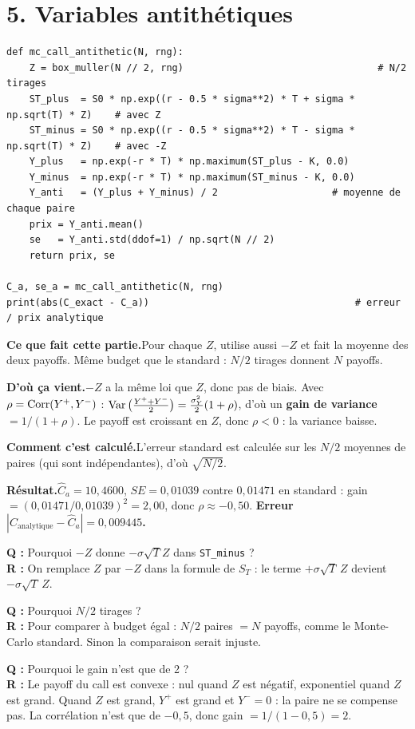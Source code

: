 \documentclass[11pt,a4paper]{article}
\newcommand{\quoi}[1]{\par\noindent\textbf{\color{bleu}Ce que fait cette partie.}\enspace #1\par}
\newcommand{\source}[1]{\par\noindent\textbf{\color{orange}D'où ça vient.}\enspace #1\par}
\newcommand{\calcul}[1]{\par\noindent\textbf{\color{bleu}Comment c'est calculé.}\enspace #1\par}
\newcommand{\resultat}[1]{\par\noindent\textbf{\color{vert}Résultat.}\enspace #1\par}
\newcommand{\prof}[2]{\begin{tcolorbox}[colback=orange!6,colframe=orange!80,boxrule=0.4pt,arc=2pt,left=5pt,right=5pt,top=2pt,bottom=2pt]\small\textbf{Q :} #1\\[1pt]\textbf{R :} #2\end{tcolorbox}}
\newcommand{\sect}[1]{\clearpage\section{#1}}
\begin{document}
\sect{5. Variables antithétiques}
\begin{lstlisting}
def mc_call_antithetic(N, rng):
    Z = box_muller(N // 2, rng)                                  # N/2 tirages
    ST_plus  = S0 * np.exp((r - 0.5 * sigma**2) * T + sigma * np.sqrt(T) * Z)    # avec Z
    ST_minus = S0 * np.exp((r - 0.5 * sigma**2) * T - sigma * np.sqrt(T) * Z)    # avec -Z
    Y_plus   = np.exp(-r * T) * np.maximum(ST_plus - K, 0.0)
    Y_minus  = np.exp(-r * T) * np.maximum(ST_minus - K, 0.0)
    Y_anti   = (Y_plus + Y_minus) / 2                    # moyenne de chaque paire
    prix = Y_anti.mean()
    se   = Y_anti.std(ddof=1) / np.sqrt(N // 2)
    return prix, se

C_a, se_a = mc_call_antithetic(N, rng)
print(abs(C_exact - C_a))                                    # erreur / prix analytique
\end{lstlisting}
\quoi{Pour chaque $Z$, utilise aussi $-Z$ et fait la moyenne des deux payoffs. Même budget que le standard : $N/2$ tirages donnent $N$ payoffs.}
\source{$-Z$ a la même loi que $Z$, donc pas de biais. Avec $\rho = \operatorname{Corr}(Y^+,Y^-)$ : $\operatorname{Var}\big(\frac{Y^++Y^-}{2}\big) = \frac{\sigma_Y^2}{2}(1+\rho)$, d'où un \textbf{gain de variance} $= 1/(1+\rho)$. Le payoff est croissant en $Z$, donc $\rho<0$ : la variance baisse.}
\calcul{L'erreur standard est calculée sur les $N/2$ moyennes de paires (qui sont indépendantes), d'où $\sqrt{N/2}$.}
\resultat{$\hat C_a = 10{,}4600$, $SE = 0{,}01039$ contre $0{,}01471$ en standard : gain $= (0{,}01471/0{,}01039)^2 = 2{,}00$, donc $\rho\approx-0{,}50$. \textbf{Erreur $|C_{\text{analytique}} - \hat C_a| = 0{,}009445$.}}
\prof{Pourquoi $-Z$ donne $-\sigma\sqrt T Z$ dans \texttt{ST\_minus} ?}{On remplace $Z$ par $-Z$ dans la formule de $S_T$ : le terme $+\sigma\sqrt T\,Z$ devient $-\sigma\sqrt T\,Z$.}
\prof{Pourquoi $N/2$ tirages ?}{Pour comparer à budget égal : $N/2$ paires $= N$ payoffs, comme le Monte-Carlo standard. Sinon la comparaison serait injuste.}
\prof{Pourquoi le gain n'est que de 2 ?}{Le payoff du call est convexe : nul quand $Z$ est négatif, exponentiel quand $Z$ est grand. Quand $Z$ est grand, $Y^+$ est grand et $Y^- = 0$ : la paire ne se compense pas. La corrélation n'est que de $-0{,}5$, donc gain $= 1/(1-0{,}5) = 2$.}
\end{document}
